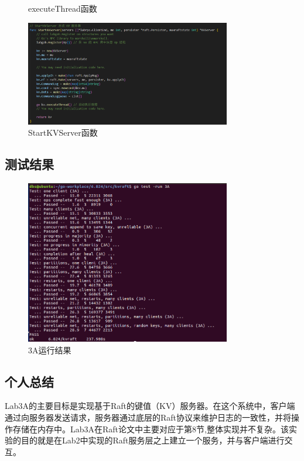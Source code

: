 \documentclass[]{article}
\begin{document}
\begin{itemize}
\begin{figure}[H]
			\caption{executeThread函数}
		\end{figure}
		\begin{figure}[H]
			\centering
			\includegraphics[width=0.8\textwidth]{./3A/StartKVServer.png}
			\caption{StartKVServer函数}
		\end{figure}
	\end{itemize}

	\subsection{测试结果}
	\begin{figure}[H]
		\centering
		\includegraphics[width=0.8\textwidth]{./3A/3A result.png}
		\caption{3A运行结果}
	\end{figure}

	\subsection{个人总结}
	Lab3A的主要目标是实现基于Raft的键值（KV）服务器。在这个系统中，客户端通过向服务器发送请求，服务器通过底层的Raft协议来维护日志的一致性，并将操作存储在内存中。Lab3A在Raft论文中主要对应于第8节,整体实现并不复杂。该实验的目的就是在Lab2中实现的Raft服务层之上建立一个服务，并与客户端进行交互。
	
\end{document}
